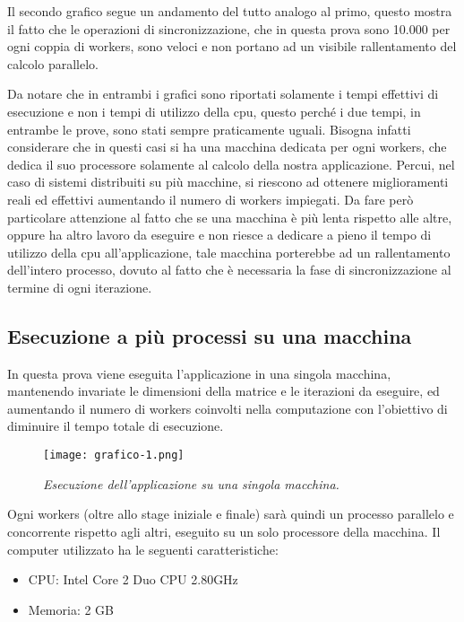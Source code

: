 Il secondo grafico segue un andamento del tutto analogo al primo, questo mostra il fatto che le operazioni di sincronizzazione, che in questa prova sono 10.000 per ogni coppia di workers, sono veloci e non portano ad un visibile rallentamento del calcolo parallelo.

Da notare che in entrambi i grafici sono riportati solamente i tempi effettivi di esecuzione e non i tempi di utilizzo della cpu, questo perch\'e i due tempi, in entrambe le prove, sono stati sempre praticamente uguali. Bisogna infatti considerare che in questi casi si ha una macchina dedicata per ogni workers, che dedica il suo processore solamente al calcolo della nostra applicazione. Percui, nel caso di sistemi distribuiti su pi\`u macchine, si riescono ad ottenere miglioramenti reali ed effettivi aumentando il numero di workers impiegati. Da fare per\`o particolare attenzione al fatto che se una macchina \`e pi\`u lenta rispetto alle altre, oppure ha altro lavoro da eseguire e non riesce a dedicare a pieno il tempo di utilizzo della cpu all'applicazione, tale macchina porterebbe ad un rallentamento dell'intero processo, dovuto al fatto che \`e necessaria la fase di sincronizzazione al termine di ogni iterazione.

\subsection{Esecuzione a pi\`u processi su una macchina}
In questa prova viene eseguita l'applicazione in una singola macchina, mantenendo invariate le dimensioni della matrice e le iterazioni da eseguire, ed aumentando il numero di workers coinvolti nella computazione con l'obiettivo di diminuire il tempo totale di esecuzione.
\begin{figure}[th]
  \centering
  \texttt{[image: grafico-1.png]}
  \caption{\emph{Esecuzione dell'applicazione su una singola macchina.}}
  \label{fig:graph_1}
\end{figure}
Ogni workers (oltre allo stage iniziale e finale) sar\`a quindi un processo parallelo e concorrente rispetto agli altri, eseguito su un solo processore della macchina. Il computer utilizzato ha le seguenti caratteristiche:
\begin{itemize}
  \item CPU: Intel Core 2 Duo CPU 2.80GHz
  \item Memoria: 2 GB
\end{itemize}

